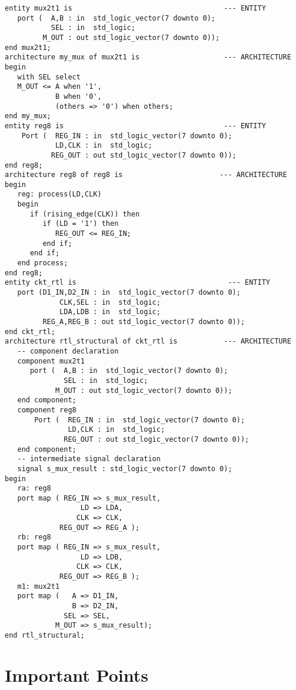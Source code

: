 \noindent
\begin{minipage}{0.99\linewidth}
\begin{lstlisting}[label=ex25_code, caption=Solution to Example 25 using a structural modeling approach.]
entity mux2t1 is                                    --- ENTITY
   port (  A,B : in  std_logic_vector(7 downto 0); 
           SEL : in  std_logic; 
         M_OUT : out std_logic_vector(7 downto 0)); 
end mux2t1; 
architecture my_mux of mux2t1 is                    --- ARCHITECTURE
begin 
   with SEL select
   M_OUT <= A when '1', 
            B when '0', 
            (others => '0') when others; 
end my_mux;
entity reg8 is                                      --- ENTITY
    Port (  REG_IN : in  std_logic_vector(7 downto 0);
            LD,CLK : in  std_logic;
           REG_OUT : out std_logic_vector(7 downto 0));
end reg8;
architecture reg8 of reg8 is                       --- ARCHITECTURE
begin
   reg: process(LD,CLK)
   begin
      if (rising_edge(CLK)) then 
         if (LD = '1') then 
            REG_OUT <= REG_IN; 
         end if;
      end if;
   end process; 
end reg8;
entity ckt_rtl is                                    --- ENTITY
   port (D1_IN,D2_IN : in  std_logic_vector(7 downto 0);
             CLK,SEL : in  std_logic; 
             LDA,LDB : in  std_logic; 
         REG_A,REG_B : out std_logic_vector(7 downto 0)); 
end ckt_rtl; 
architecture rtl_structural of ckt_rtl is           --- ARCHITECTURE
   -- component declaration
   component mux2t1 
      port (  A,B : in  std_logic_vector(7 downto 0); 
              SEL : in  std_logic; 
            M_OUT : out std_logic_vector(7 downto 0)); 
   end component;
   component reg8 
       Port (  REG_IN : in  std_logic_vector(7 downto 0);
               LD,CLK : in  std_logic;
              REG_OUT : out std_logic_vector(7 downto 0));
   end component;
   -- intermediate signal declaration
   signal s_mux_result : std_logic_vector(7 downto 0); 	
begin
   ra: reg8
   port map ( REG_IN => s_mux_result,
                  LD => LDA,
                 CLK => CLK,
             REG_OUT => REG_A ); 
   rb: reg8
   port map ( REG_IN => s_mux_result,
                  LD => LDB,
                 CLK => CLK,
             REG_OUT => REG_B ); 			 
   m1: mux2t1
   port map (   A => D1_IN, 
                B => D2_IN,
              SEL => SEL,
            M_OUT => s_mux_result); 				 
end rtl_structural;
\end{lstlisting}
\end{minipage}

\section{Important Points}

